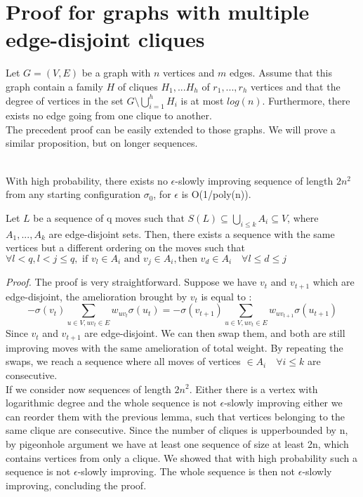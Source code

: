 \section{Proof for graphs with multiple edge-disjoint cliques}
Let $G = (V,E)$ be a graph with $n$ vertices and $m$ edges. Assume that this graph contain a family $H$ of cliques $H_1, ... H_h$ of $r_1, ... , r_h$ vertices and that the degree of vertices in the set $G \setminus \bigcup_{i = 1}^h H_i$ is at most $log(n)$. Furthermore, there exists no edge going from one clique to another.\\

The precedent proof can be easily extended to those graphs. We will prove a similar proposition, but on longer sequences.

\begin{proposition}
\leavevmode \\
With high probability, there exists no $\epsilon$-slowly improving sequence of length $2n^2$ from any starting configuration $\sigma_0$, for $\epsilon$ is O(1/poly(n)).
\end{proposition}

\begin{lemma}
\label{edgeDisjoint}
Let $L$ be a sequence of q moves such that $S(L) \subseteq \bigcup_{i \leq k}A_i  \subseteq V$, where $A_1, ... , A_k$ are edge-disjoint sets. Then, there exists a sequence with the same vertices but a different ordering on the moves such that $\forall l < q, l < j \leq q, \text{ if } v_l \in A_i \text{ and } v_j \in A_i, \text{then } v_d \in A_i \quad\forall l \leq d  \leq j$   
\end{lemma}
\textit{Proof.} The proof is very straightforward. Suppose we have $v_t$ and $v_{t+1}$ which are edge-disjoint, the amelioration brought by $v_t$ is equal to :
\begin{equation*}
-\sigma(v_t) \sum_{u \in V, uv_t \in E}w_{uv_t}\sigma(u_t) = -\sigma(v_{t+1}) \sum_{u \in V, uv_t \in E}w_{uv_{t+1}}\sigma(u_{t + 1}) 
\end{equation*}
Since $v_t$ and $v_{t+1}$ are edge-disjoint. We can then swap them, and both are still improving moves with the same amelioration of total weight. By repeating the swaps, we reach a sequence where all moves of vertices $\in A_i \quad \forall i \leq k$ are consecutive.\\

If we consider now sequences of length $2n^2$. Either there is a vertex with logarithmic degree and the whole sequence is not $\epsilon$-slowly improving either we can reorder them with the previous lemma, such that vertices belonging to the same clique are consecutive. Since the number of cliques is upperbounded by n, by pigeonhole argument we have at least one sequence of size at least 2n, which contains vertices from only a clique. We showed that with high probability such a sequence is not $\epsilon$-slowly improving. The whole sequence is then not $\epsilon$-slowly improving, concluding the proof.